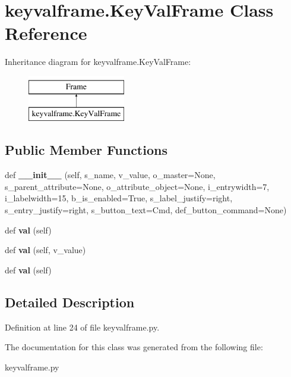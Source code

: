 \hypertarget{classkeyvalframe_1_1KeyValFrame}{}\section{keyvalframe.\+Key\+Val\+Frame Class Reference}
\label{classkeyvalframe_1_1KeyValFrame}
Inheritance diagram for keyvalframe.\+Key\+Val\+Frame\+:\begin{figure}[H]
\begin{center}
\leavevmode
\includegraphics[height=2.000000cm]{classkeyvalframe_1_1KeyValFrame}
\end{center}
\end{figure}
\subsection*{Public Member Functions}
\begin{DoxyCompactItemize}
\item 
def {\bfseries \+\_\+\+\_\+init\+\_\+\+\_\+} (self, s\+\_\+name, v\+\_\+value, o\+\_\+master=None, s\+\_\+parent\+\_\+attribute=None, o\+\_\+attribute\+\_\+object=None, i\+\_\+entrywidth=7, i\+\_\+labelwidth=15, b\+\_\+is\+\_\+enabled=True, s\+\_\+label\+\_\+justify=\textquotesingle{}right\textquotesingle{}, s\+\_\+entry\+\_\+justify=\textquotesingle{}right\textquotesingle{}, s\+\_\+button\+\_\+text=\textquotesingle{}Cmd\textquotesingle{}, def\+\_\+button\+\_\+command=None)\hypertarget{classkeyvalframe_1_1KeyValFrame_aaf3e7457b77e699729c06b983788d44f}{}\label{classkeyvalframe_1_1KeyValFrame_aaf3e7457b77e699729c06b983788d44f}

\item 
def {\bfseries val} (self)\hypertarget{classkeyvalframe_1_1KeyValFrame_a4e1c0191a343e296bc1d167c88d0284f}{}\label{classkeyvalframe_1_1KeyValFrame_a4e1c0191a343e296bc1d167c88d0284f}

\item 
def {\bfseries val} (self, v\+\_\+value)\hypertarget{classkeyvalframe_1_1KeyValFrame_aeaed0bb58ab9b0e82f68539591424ed2}{}\label{classkeyvalframe_1_1KeyValFrame_aeaed0bb58ab9b0e82f68539591424ed2}

\item 
def {\bfseries val} (self)\hypertarget{classkeyvalframe_1_1KeyValFrame_a4e1c0191a343e296bc1d167c88d0284f}{}\label{classkeyvalframe_1_1KeyValFrame_a4e1c0191a343e296bc1d167c88d0284f}

\end{DoxyCompactItemize}


\subsection{Detailed Description}


Definition at line 24 of file keyvalframe.\+py.



The documentation for this class was generated from the following file\+:\begin{DoxyCompactItemize}
\item 
keyvalframe.\+py\end{DoxyCompactItemize}
